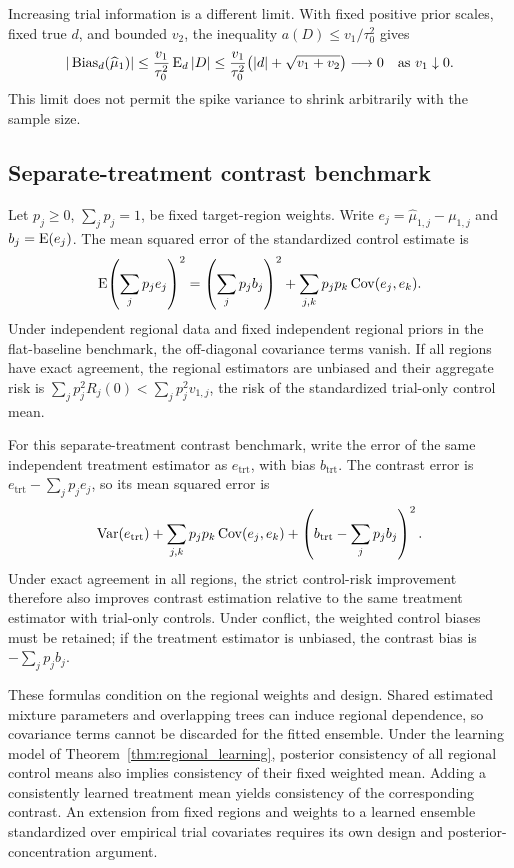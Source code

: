 Increasing trial information is a different limit. With fixed positive prior scales, fixed true $d$, and bounded $v_2$, the inequality $a(D)\leq v_1/\tau_0^2$ gives
\begin{equation}\label{eq:regional_increasing_trial}
|\operatorname{Bias}_d(\widehat\mu_1)|
\leq\frac{v_1}{\tau_0^2}\operatorname{E}_d|D|
\leq\frac{v_1}{\tau_0^2}\bigl(|d|+\sqrt{v_1+v_2}\bigr)
\longrightarrow0\quad\text{as }v_1\downarrow0.
\end{equation}
This limit does not permit the spike variance to shrink arbitrarily with the sample size.

\subsection{Separate-treatment contrast benchmark}\label{sec:C.4}
Let $p_j\geq0$, $\sum_jp_j=1$, be fixed target-region weights. Write $e_j=\widehat\mu_{1,j}-\mu_{1,j}$ and $b_j=\operatorname{E}(e_j)$. The mean squared error of the standardized control estimate is
\begin{equation}\label{eq:regional_aggregate_risk}
\operatorname{E}\!\left(\sum_jp_je_j\right)^2
=\left(\sum_jp_jb_j\right)^2+
\sum_{j,k}p_jp_k\operatorname{Cov}(e_j,e_k).
\end{equation}
Under independent regional data and fixed independent regional priors in the flat-baseline benchmark, the off-diagonal covariance terms vanish. If all regions have exact agreement, the regional estimators are unbiased and their aggregate risk is $\sum_jp_j^2R_j(0)<\sum_jp_j^2v_{1,j}$, the risk of the standardized trial-only control mean.

For this separate-treatment contrast benchmark, write the error of the same independent treatment estimator as $e_{\mathrm{trt}}$, with bias $b_{\mathrm{trt}}$. The contrast error is $e_{\mathrm{trt}}-\sum_jp_je_j$, so its mean squared error is
\[
\operatorname{Var}(e_{\mathrm{trt}})+\sum_{j,k}p_jp_k\operatorname{Cov}(e_j,e_k)
+\left(b_{\mathrm{trt}}-\sum_jp_jb_j\right)^2.
\]
Under exact agreement in all regions, the strict control-risk improvement therefore also improves contrast estimation relative to the same treatment estimator with trial-only controls. Under conflict, the weighted control biases must be retained; if the treatment estimator is unbiased, the contrast bias is $-\sum_jp_jb_j$.

These formulas condition on the regional weights and design. Shared estimated mixture parameters and overlapping trees can induce regional dependence, so covariance terms cannot be discarded for the fitted ensemble. Under the learning model of Theorem~\ref{thm:regional_learning}, posterior consistency of all regional control means also implies consistency of their fixed weighted mean. Adding a consistently learned treatment mean yields consistency of the corresponding contrast. An extension from fixed regions and weights to a learned ensemble standardized over empirical trial covariates requires its own design and posterior-concentration argument.

